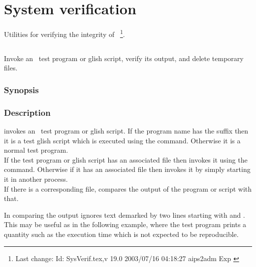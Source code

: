 \chapter{System verification}
\label{System verification}

Utilities for verifying the integrity of \aipspp\ \footnote{Last change:
$ $Id: SysVerif.tex,v 19.0 2003/07/16 04:18:27 aips2adm Exp $ $}.


\section{}
\label{assay}
 
Invoke an \aipspp\ test program or glish script, verify its output,
and delete temporary files.

\subsection*{Synopsis}
 
\begin{synopsis}
\end{synopsis}
 
\subsection*{Description}
 
 invokes an \aipspp\ test program or glish script.
If the program name has the suffix  then it is a test glish
script which is executed using the  command.
Otherwise it is a normal test program.
\\If the test program or glish script has an
associated  file then  invokes it using
the  command.  Otherwise if it has an associated
 file then  invokes it by simply starting
it in another process.
\\
If there is a corresponding  file,  compares
the output of the program or script with that.

In comparing the output  ignores text demarked by two lines
starting with \code{>>>} and \code{<<<}.  This may be useful as in the
following example, where the test program prints a quantity such as the
execution time which is not expected to be reproducible.

